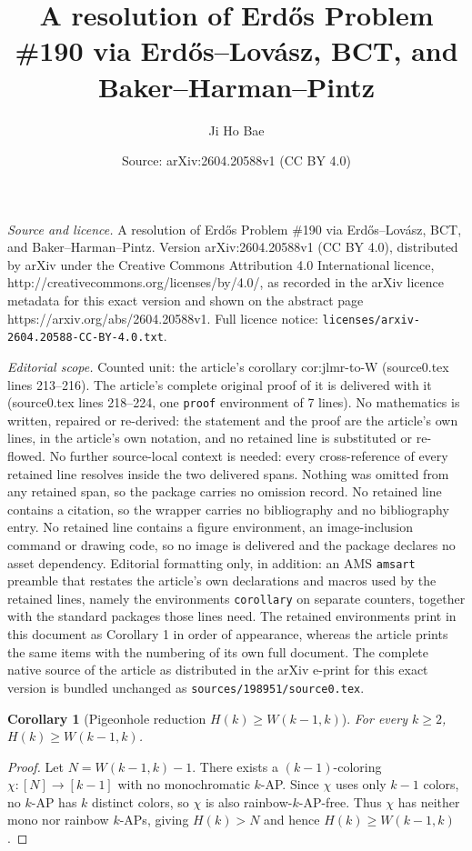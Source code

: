 \documentclass[10pt,a4paper]{amsart}
\title{A resolution of Erd\H{o}s Problem \#190 via Erd\H{o}s--Lov\'asz, BCT, and Baker--Harman--Pintz}
\author{Ji Ho Bae}
\date{Source: arXiv:2604.20588v1 (CC BY 4.0)}
\newtheorem{corollary}{Corollary}
\begin{document}
\maketitle

\noindent\emph{Source and licence.} A resolution of Erd\H{o}s Problem \#190 via Erd\H{o}s--Lov\'asz, BCT, and Baker--Harman--Pintz. Version arXiv:2604.20588v1 (CC BY 4.0), distributed by arXiv under the Creative Commons Attribution 4.0 International licence, http://creativecommons.org/licenses/by/4.0/, as recorded in the arXiv licence metadata for this exact version and shown on the abstract page https://arxiv.org/abs/2604.20588v1. Full licence notice: \texttt{licenses/arxiv-2604.20588-CC-BY-4.0.txt}.\par\smallskip

\noindent\textit{Editorial scope.} Counted unit: the article's corollary cor:jlmr-to-W (source0.tex lines 213--216). The article's complete original proof of it is delivered with it (source0.tex lines 218--224, one \texttt{proof} environment of 7 lines). No mathematics is written, repaired or re-derived: the statement and the proof are the article's own lines, in the article's own notation, and no retained line is substituted or re-flowed.  No further source-local context is needed: every cross-reference of every retained line resolves inside the two delivered spans.  Nothing was omitted from any retained span, so the package carries no omission record.  No retained line contains a citation, so the wrapper carries no bibliography and no bibliography entry.  No retained line contains a figure environment, an image-inclusion command or drawing code, so no image is delivered and the package declares no asset dependency.  Editorial formatting only, in addition: an AMS \texttt{amsart} preamble that restates the article's own declarations and macros used by the retained lines, namely the environments \texttt{corollary} on separate counters, together with the standard packages those lines need.  The retained environments print in this document as Corollary 1 in order of appearance, whereas the article prints the same items with the numbering of its own full document.  The complete native source of the article as distributed in the arXiv e-print for this exact version is bundled unchanged as \texttt{sources/198951/source0.tex}.
\begin{corollary}[Pigeonhole reduction $H(k)\ge W(k-1,k)$]
\label{cor:jlmr-to-W}
For every $k\ge 2$, $H(k)\ge W(k-1,k)$.
\end{corollary}

\begin{proof}
Let $N=W(k-1,k)-1$. There exists a $(k-1)$-coloring
$\chi:[N]\to[k-1]$ with no monochromatic $k$-AP. Since $\chi$ uses
only $k-1$ colors, no $k$-AP has $k$ distinct colors, so $\chi$ is
also rainbow-$k$-AP-free. Thus $\chi$ has neither mono nor rainbow
$k$-APs, giving $H(k)>N$ and hence $H(k)\ge W(k-1,k)$.
\end{proof}
\end{document}
